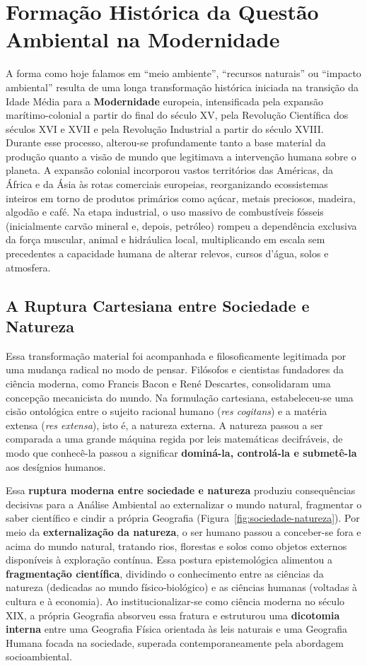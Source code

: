 \section{Formação Histórica da Questão Ambiental na Modernidade}

A forma como hoje falamos em ``meio ambiente'', ``recursos naturais'' ou ``impacto ambiental'' resulta de uma longa transformação histórica iniciada na transição da Idade Média para a \textbf{Modernidade} europeia, intensificada pela expansão marítimo-colonial a partir do final do século XV, pela Revolução Científica dos séculos XVI e XVII e pela Revolução Industrial a partir do século XVIII. Durante esse processo, alterou-se profundamente tanto a base material da produção quanto a visão de mundo que legitimava a intervenção humana sobre o planeta. A expansão colonial incorporou vastos territórios das Américas, da África e da Ásia às rotas comerciais europeias, reorganizando ecossistemas inteiros em torno de produtos primários como açúcar, metais preciosos, madeira, algodão e café. Na etapa industrial, o uso massivo de combustíveis fósseis (inicialmente carvão mineral e, depois, petróleo) rompeu a dependência exclusiva da força muscular, animal e hidráulica local, multiplicando em escala sem precedentes a capacidade humana de alterar relevos, cursos d'água, solos e atmosfera.

\subsection{A Ruptura Cartesiana entre Sociedade e Natureza}

Essa transformação material foi acompanhada e filosoficamente legitimada por uma mudança radical no modo de pensar. Filósofos e cientistas fundadores da ciência moderna, como Francis Bacon e René Descartes, consolidaram uma concepção mecanicista do mundo. Na formulação cartesiana, estabeleceu-se uma cisão ontológica entre o sujeito racional humano (\emph{res cogitans}) e a matéria extensa (\emph{res extensa}), isto é, a natureza externa. A natureza passou a ser comparada a uma grande máquina regida por leis matemáticas decifráveis, de modo que conhecê-la passou a significar \textbf{dominá-la, controlá-la e submetê-la} aos desígnios humanos.

Essa \textbf{ruptura moderna entre sociedade e natureza} produziu consequências decisivas para a Análise Ambiental ao externalizar o mundo natural, fragmentar o saber científico e cindir a própria Geografia (Figura~\ref{fig:sociedade-natureza}). Por meio da \textbf{externalização da natureza}, o ser humano passou a conceber-se fora e acima do mundo natural, tratando rios, florestas e solos como objetos externos disponíveis à exploração contínua. Essa postura epistemológica alimentou a \textbf{fragmentação científica}, dividindo o conhecimento entre as ciências da natureza (dedicadas ao mundo físico-biológico) e as ciências humanas (voltadas à cultura e à economia). Ao institucionalizar-se como ciência moderna no século XIX, a própria Geografia absorveu essa fratura e estruturou uma \textbf{dicotomia interna} entre uma Geografia Física orientada às leis naturais e uma Geografia Humana focada na sociedade, superada contemporaneamente pela abordagem socioambiental.

